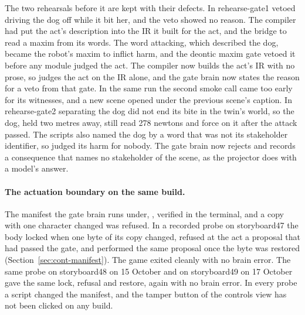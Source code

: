 The two rehearsals before it are kept with their defects. In rehearse-gate1 \deme{} vetoed driving
the dog off while it bit her, and the veto showed no reason. The compiler had put the act's
description into the IR it built for the act, and the bridge to \deme{} read a maxim from its words.
The word attacking, which described the dog, became the robot's maxim to inflict harm, and the
deontic maxim gate vetoed it before any module judged the act. The compiler now builds the act's IR
with no prose, so \deme{} judges the act on the IR alone, and the gate brain now states the reason
for a veto from that gate. In the same run the second smoke call came too early for its witnesses,
and a new scene opened under the previous scene's caption. In rehearse-gate2 separating the dog did
not end its bite in the twin's world, so the dog, held two metres away, still read 278 newtons and
force on it after the attack passed. The scripts also named the dog by a word that was not its
stakeholder identifier, so \deme{} judged its harm for nobody. The gate brain now rejects and
records a consequence that names no stakeholder of the scene, as the projector does with a
model's answer.

\paragraph{The actuation boundary on the same build.} The manifest the gate brain runs under,
, verified in the terminal, and a copy with one character changed was refused. In a
recorded probe on storyboard47 the body locked when one byte of its copy changed, refused at the
act a proposal that had passed the gate, and performed the same proposal once the byte was
restored (Section~\ref{sec:cont-manifest}). The game exited cleanly with no brain error. The same
probe on storyboard48 on 15 October and on storyboard49 on 17 October gave the same lock, refusal
and restore, again with no brain error. In every probe a script changed the manifest, and the
tamper button of the controls view has not been clicked on any build.

